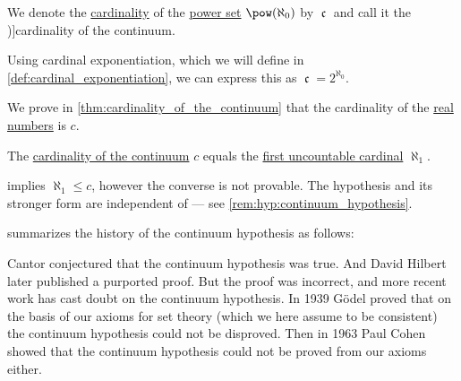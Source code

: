 \begin{definition}\label{def:cardinality_of_the_continuum}
  We denote the \hyperref[def:cardinality]{cardinality} of the \hyperref[def:power_set]{power set} \( \pow(\aleph_0) \) by \( \mfrakc \) and call it the \term[ru=мощность континуума (\cite[33]{Александров1977ОбщаяТопология})]{cardinality of the continuum}.
\end{definition}
\begin{comments}
  \item Using cardinal exponentiation, which we will define in \cref{def:cardinal_exponentiation}, we can express this as \( \mfrakc = 2^{\aleph_0} \).
\end{comments}
\begin{comments}
  \item We prove in \cref{thm:cardinality_of_the_continuum} that the cardinality of the \hyperref[def:real_numbers]{real numbers} is \( c \).
\end{comments}

\begin{conjecture}\label{hyp:continuum_hypothesis}
  The \hyperref[def:cardinality_of_the_continuum]{cardinality of the continuum} \( c \) equals the \hyperref[def:aleph_zero_related_cardinalities]{first uncountable cardinal} \( \aleph_1 \).
\end{conjecture}
\begin{comments}
  \item {} implies \( \aleph_1 \leq c \), however the converse is not provable. The hypothesis and its stronger form  are independent of \hyperref[def:zfc]{} --- see \cref{rem:hyp:continuum_hypothesis}.
\end{comments}

\begin{remark}\label{rem:hyp:continuum_hypothesis}
  \Textcite[166]{Enderton1977SetTheory} summarizes the history of the continuum hypothesis as follows:
  \begin{displayquote}
    Cantor conjectured that the continuum hypothesis was true. And David Hilbert later published a purported proof. But the proof was incorrect, and more recent work has cast doubt on the continuum hypothesis. In 1939 G\"odel proved that on the basis of our axioms for set theory (which we here assume to be consistent) the continuum hypothesis could not be disproved. Then in 1963 Paul Cohen showed that the continuum hypothesis could not be proved from our axioms either.
  \end{displayquote}
\end{remark}

